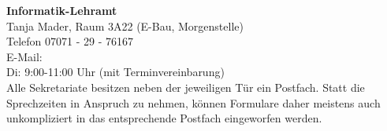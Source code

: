 \textbf{Informatik-Lehramt}\\
Tanja Mader, Raum 3A22 (E-Bau, Morgenstelle)\\
Telefon 07071 - 29 - 76167\\
E-Mail: \\
Di: 9:00-11:00 Uhr (mit Terminvereinbarung)\\

Alle Sekretariate besitzen neben der jeweiligen Tür ein Postfach. Statt die
Sprechzeiten in Anspruch zu nehmen, können Formulare daher meistens auch
unkompliziert in das entsprechende Postfach eingeworfen werden.\\
